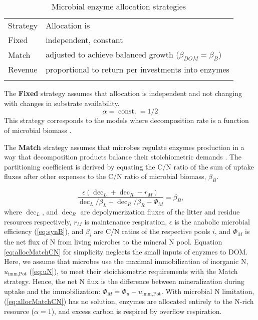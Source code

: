 \begin{table}[t]
\caption{Microbial enzyme allocation strategies \label{tab:AllocStrategies}}
\vskip4mm
\centering
\begin{tabular}{ll}
\tophline
Strategy &  Allocation is \\
\middlehline
Fixed & independent, constant \\
Match & adjusted to achieve balanced growth ($\beta_{DOM} = \beta_{B}$)  \\
Revenue & proportional to return per investments into enzymes \\
\bottomhline
\end{tabular}
\end{table}


The \textbf{Fixed} strategy assumes that allocation is independent
and not changing with changes in substrate availability.
\begin{equation} 
\label{eq:allocFixed}
\alpha = \operatorname{const.} = 1/2
\end{equation}
This strategy corresponds to the models where decomposition rate is a function
of microbial biomass \citep{Wutzler08}.
 
The \textbf{Match} strategy assumes that microbes regulate enzymes production in
a way that decomposition products balance their stoichiometric demands
\citep{Moorhead12}.
The partitioning coefficient is derived by equating the C/N ratio of the sum of
uptake fluxes after other expenses to the C/N ratio of microbial biomass,
$\beta_B$.

\begin{equation} 
\label{eq:allocMatchCN}
\frac{\epsilon (\operatorname{dec}_L + \operatorname{dec}_R - r_M)}{
\operatorname{dec}_L/\beta_L + \operatorname{dec}_R/\beta_R  - \Phi_M } =
\beta_B
\text{,}
\end{equation}
where $\operatorname{dec}_L$, and $\operatorname{dec}_R$ are depolymerization
fluxes of the litter and residue resources respectively, $r_M$ is maintenance
respiration, $\epsilon$ is the anabolic microbial efficiency (\ref{eq:synB}),
and $\beta_i$ are C/N ratios of the respective pools $i$, and $\Phi_M$ is the
net flux of N from living microbes to the mineral N pool. Equation
\ref{eq:allocMatchCN} for simplicity neglects the small inputs of enyzmes to DOM. Here, we assume that
microbes use the maximal immobilization of inorganic N, $u_{\operatorname{imm,Pot}}$ (\ref{eq:uN}), to meet their stoichiometric
requirements with the Match strategy. Hence, the net N flux is the difference
between mineralization during uptake and the immobilization: $\Phi_M = \Phi_u -
u_{\operatorname{imm,Pot}}$. With microbial N limitation,
(\ref{eq:allocMatchCN})  has no solution, enzymes are allocated entirely to
the N-rich resource ($\alpha=1$), and excess carbon is
respired by overflow respiration.

